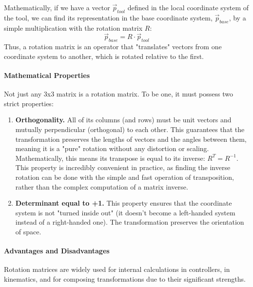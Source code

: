 Mathematically, if we have a vector $\vec{p}_{tool}$ defined in the local coordinate system of the tool, we can find its representation in the base coordinate system, $\vec{p}_{base}$, by a simple multiplication with the rotation matrix $R$:
$$ \vec{p}_{base} = R \cdot \vec{p}_{tool} $$
Thus, a rotation matrix is an operator that "translates" vectors from one coordinate system to another, which is rotated relative to the first.

\paragraph{Mathematical Properties}
Not just any 3x3 matrix is a rotation matrix. To be one, it must possess two strict properties:
\begin{enumerate}
    \item \textbf{Orthogonality.} All of its columns (and rows) must be unit vectors and mutually perpendicular (orthogonal) to each other. This guarantees that the transformation preserves the lengths of vectors and the angles between them, meaning it is a "pure" rotation without any distortion or scaling. Mathematically, this means its transpose is equal to its inverse: $R^T = R^{-1}$. This property is incredibly convenient in practice, as finding the inverse rotation can be done with the simple and fast operation of transposition, rather than the complex computation of a matrix inverse.
    \item \textbf{Determinant equal to +1.} This property ensures that the coordinate system is not "turned inside out" (it doesn't become a left-handed system instead of a right-handed one). The transformation preserves the orientation of space.
\end{enumerate}

\paragraph{Advantages and Disadvantages}
Rotation matrices are widely used for internal calculations in controllers, in kinematics, and for composing transformations due to their significant strengths.

